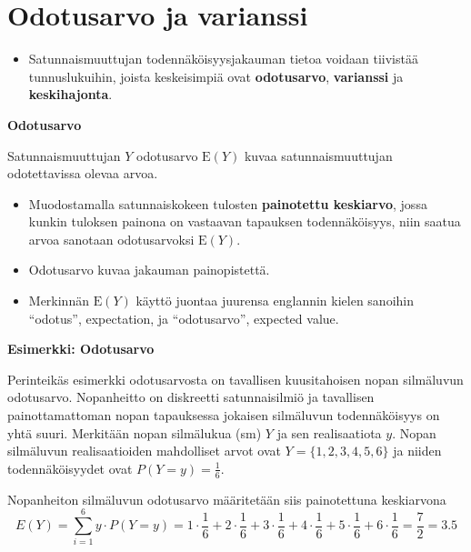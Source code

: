 \documentclass[
]{book}
\providecommand{\tightlist}{%
  \setlength{\itemsep}{0pt}\setlength{\parskip}{0pt}}
\begin{document}
\hypertarget{alaluku44}{%
\section{Odotusarvo ja varianssi}\label{alaluku44}}

\begin{itemize}
\tightlist
\item
  Satunnaismuuttujan todennäköisyysjakauman tietoa voidaan tiivistää tunnuslukuihin, joista keskeisimpiä ovat \textbf{odotusarvo}, \textbf{varianssi} ja \textbf{keskihajonta}.
\end{itemize}

\begin{defblock}{}

\textbf{Odotusarvo}

Satunnaismuuttujan \(Y\) odotusarvo \(\text{E}(Y)\) kuvaa satunnaismuuttujan odotettavissa olevaa arvoa.

\begin{itemize}
\tightlist
\item
  Muodostamalla satunnaiskokeen tulosten \textbf{painotettu keskiarvo}, jossa kunkin tuloksen painona on vastaavan tapauksen todennäköisyys, niin saatua arvoa sanotaan odotusarvoksi \(\text{E}(Y)\).
\item
  Odotusarvo kuvaa jakauman painopistettä.
\item
  Merkinnän \(\text{E}(Y)\) käyttö juontaa juurensa englannin kielen sanoihin ``odotus'', expectation, ja ``odotusarvo'', expected value.
\end{itemize}

\end{defblock}

\newpage

\begin{eblock}{}
\textbf{Esimerkki: Odotusarvo}

Perinteikäs esimerkki odotusarvosta on tavallisen kuusitahoisen nopan silmäluvun odotusarvo. Nopanheitto on diskreetti satunnaisilmiö ja tavallisen painottamattoman nopan tapauksessa jokaisen silmäluvun todennäköisyys on yhtä suuri. Merkitään nopan silmälukua (sm) \(Y\) ja sen realisaatiota \(y\). Nopan silmäluvun realisaatioiden mahdolliset arvot ovat \(Y = \{1,2,3,4,5,6\}\) ja niiden todennäköisyydet ovat \(P(Y=y) = \frac{1}{6}\).

Nopanheiton silmäluvun odotusarvo määritetään siis painotettuna keskiarvona \[E(Y) = \sum_{i=1}^6 y \cdot P(Y=y)  = 1 \cdot \frac{1}{6} + 2 \cdot \frac{1}{6} + 3 \cdot \frac{1}{6} + 4 \cdot \frac{1}{6} + 5 \cdot \frac{1}{6} + 6 \cdot \frac{1}{6} = \frac{7}{2} = 3.5\]

\end{eblock}
\end{document}
